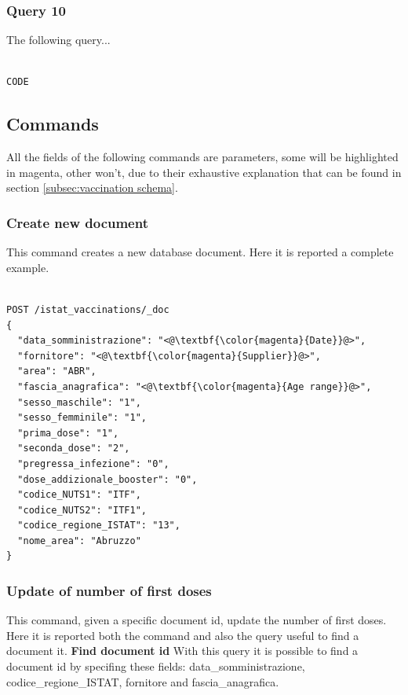 \documentclass{article}
\begin{document}
\subsubsection{Query 10}
The following query...

\begin{lstlisting}[language=cypher, label=lst:cypher-example]

CODE

\end{lstlisting}
\newpage
\subsection{Commands}
All the fields of the following commands are parameters, some will be highlighted in magenta, other won't, due to their exhaustive explanation that can be found in section \ref{subsec:vaccination schema}.
\subsubsection{Create new document}
This command creates a new database document. Here it is reported a complete example. 

\begin{lstlisting}[language=cypher, label=lst:cypher-example]

POST /istat_vaccinations/_doc
{
  "data_somministrazione": "<@\textbf{\color{magenta}{Date}}@>",
  "fornitore": "<@\textbf{\color{magenta}{Supplier}}@>",
  "area": "ABR",
  "fascia_anagrafica": "<@\textbf{\color{magenta}{Age range}}@>",
  "sesso_maschile": "1",
  "sesso_femminile": "1",
  "prima_dose": "1",
  "seconda_dose": "2",
  "pregressa_infezione": "0",
  "dose_addizionale_booster": "0",
  "codice_NUTS1": "ITF",
  "codice_NUTS2": "ITF1",
  "codice_regione_ISTAT": "13",
  "nome_area": "Abruzzo"
}

\end{lstlisting}
\newpage
\subsubsection{Update of number of first doses}
This command, given a specific document id, update the number of first doses. Here it is reported both the command and also the query useful to find a document it.
\hfill\break
\hfill\break
\textbf{Find document id}
\hfill\break
With this query it is possible to find a document id by specifing these fields: data\_somministrazione, codice\_regione\_ISTAT, fornitore and fascia\_anagrafica.
\end{document}
